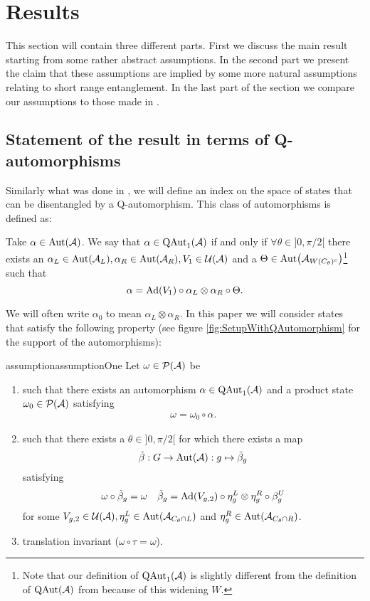 \documentclass[11pt,a4paper,twoside]{article}
\numberwithin{equation}{section}
\begin{document}
\section{Results}
This section will contain three different parts. First we discuss the main result starting from some rather abstract assumptions. In the second part we present the claim that these assumptions are implied by some more natural assumptions relating to short range entanglement. In the last part of the section we compare our assumptions to those made in \cite{ogata2021h3gmathbb}.
\subsection{Statement of the result in terms of Q-automorphisms}\label{sec:Results_2}

Similarly what was done in \cite{ogata2021h3gmathbb}, we will define an index on the space of states that can be disentangled by a Q-automorphism. This class of automorphisms is defined as:
\begin{definition}
	Take $\alpha\in\Aut{\AA}$. We say that $\alpha\in\QAut{\AA}$ if and only if $\forall\theta\in]0,\pi/2[$ there exists an $\alpha_L\in\Aut{\AA_L},\alpha_R\in\Aut{\AA_R},V_1\in\UU(\AA)$ and a $\Theta\in\Aut{\AA_{W(C_\theta)^c}}$\footnote{Note that our definition of $\QAut{\AA}$ is slightly different from the definition of $\textrm{QAut}(\AA)$ from \cite{ogata2021h3gmathbb} because of this widening $W$.} such that
	\begin{equation}
		\alpha=\Ad{V_1}\circ\alpha_L\otimes\alpha_R\circ\Theta.
	\end{equation}
\end{definition}
We will often write $\alpha_0$ to mean $\alpha_L\otimes\alpha_R$. In this paper we will consider states that satisfy the following property (see figure \ref{fig:SetupWithQAutomorphism} for the support of the automorphisms):
\begin{restatable}{assumption}{assumptionOne}\label{assumption}
	Let $\omega\in\PP(\AA)$ be
	\begin{enumerate}
		\item such that there exists an automorphism $\alpha\in\QAut{\AA}$ and a product state $\omega_0\in\PP(\AA)$ satisfying
		\begin{align}
			\omega=\omega_0\circ\alpha.
		\end{align}
		\item such that there exists a $\theta\in]0,\pi/2[$ for which there exists a map
		\begin{equation}
			\tilde\beta:G\rightarrow\Aut{\AA}:g\mapsto\tilde\beta_g
		\end{equation}
		satisfying
		\begin{align}
			\omega\circ\tilde\beta_g&=\omega&\tilde\beta_g=\Ad{V_{g,2}}\circ\eta^L_g\otimes\eta^R_g\circ\beta^U_g
		\end{align}
		for some $V_{g,2}\in\UU(\AA),\eta^L_g\in\Aut{\AA_{C_\theta\cap L}}$ and $\eta^R_g\in\Aut{\AA_{C_\theta\cap R}}$.
		\item translation invariant ($\omega\circ\tau=\omega$).
	\end{enumerate}
\end{restatable}
\end{document}
